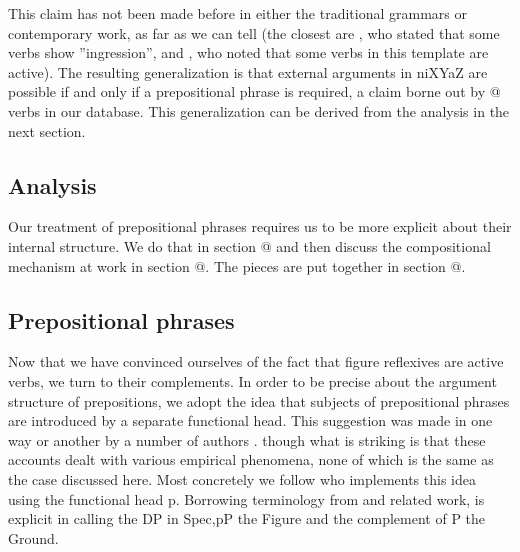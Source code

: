 This claim has not been made before in either the traditional grammars or contemporary work, as far as we can tell (the closest are \citet[87]{berman78}, who stated that some verbs show ''ingression'', and \cite{schwarzwald08}, who noted that some verbs in this template are active). The resulting generalization is that external arguments in niXYaZ are possible if and only if a prepositional phrase is required, a claim borne out by @ verbs in our database. This generalization can be derived from the analysis in the next section.

	\subsection{Analysis}
Our treatment of prepositional phrases requires us to be more explicit about their internal structure. We do that in section @ and then discuss the compositional mechanism at work in section @. The pieces are put together in section @.

	\subsection{Prepositional phrases}
Now that we have convinced ourselves of the fact that figure reflexives are active verbs, we turn to their complements. In order to be precise about the argument structure of prepositions, we adopt the idea that subjects of prepositional phrases are introduced by a separate functional head. This suggestion was made in one way or another by a number of authors \citep{vanriemsdijk90,rooryck96,koopman97,gehrke08phd,dendikken03,dendikken10}. though what is striking is that these accounts dealt with various empirical phenomena, none of which is the same as the case discussed here. Most concretely we follow \cite{svenonius03,svenonius07,svenonius10} who implements this idea using the functional head p. Borrowing terminology from \cite{talmy78} and related work, \cite{wood14nllt} is explicit in calling the DP in Spec,pP the Figure and the complement of P the Ground.

